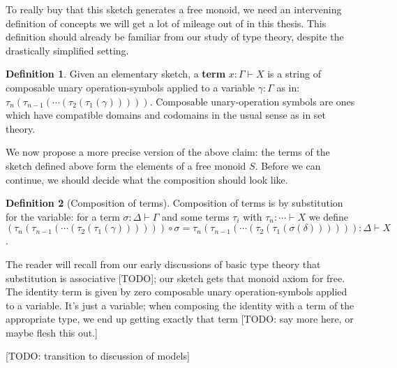 \documentclass[12pt,twoside]{reedthesis}
\theoremstyle{definition}
\newtheorem{definition}{Definition}
\theoremstyle{remark}
\theoremstyle{plain}
\begin{document}
To really buy that this sketch generates a free monoid, we need an intervening
definition of concepts we will get a lot of mileage out of in this thesis. This
definition should already be familiar from our study of type theory, despite
the drastically simplified setting.
\begin{definition}\label{def:term}
  Given an elementary sketch, a \textbf{term} $x : \Gamma \vdash X$ is a string of
  composable unary operation-symbols applied to a variable $\gamma : \Gamma$ as in:
  \( \tau_{n} (\tau_{n-1} (\cdots (\tau_{2}(\tau_{1}(\gamma))))) \). Composable unary-operation
  symbols are ones which have compatible domains and codomains in the usual
  sense as in set theory.
\end{definition}

We now propose a more precise version of the above claim: the terms of the
sketch defined above form the elements of a free monoid \( S \). Before we can
continue, we should decide what the composition should look like.

\begin{definition}[Composition of terms]
  Composition of terms is by substitution for the variable: for a term
  \( \sigma : \Delta \vdash \Gamma\) and some terms \( \tau_{i}\) with \( \tau_{n} : \cdots \vdash X \) we define
  \[ (\tau_{n} (\tau_{n-1} (\cdots (\tau_{2}(\tau_{1}(\gamma)))))) \circ \sigma = \tau_{n} (\tau_{n-1} (\cdots (\tau_{2}(\tau_{1}(\sigma(\delta)))))) : \Delta \vdash X \].
\end{definition}


The reader will recall from our early discussions of basic type theory that
substitution is associative [TODO]; our sketch gets that monoid axiom for free. The
identity term is given by zero composable unary operation-symbols applied to a
variable. It's just a variable; when composing the identity with a term of the
appropriate type, we end up getting exactly that term [TODO: say more here, or maybe
flesh this out.]

  [TODO: transition to discussion of models]
\end{document}
